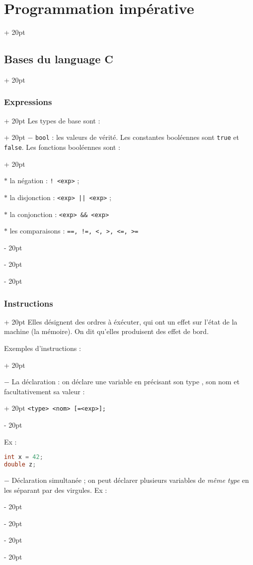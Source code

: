 \documentclass[a4paper, 12pt, twoside]{article}
\newcommand{\ind}[1][20pt]{\advance\leftskip + #1}
\newcommand{\deind}[1][20pt]{\advance\leftskip - #1}
\newcommand{\indented}[2][20pt]{\par \ind[#1] #2 \par \deind[#1]}
\newenvironment{indentedenv}[1][20pt]{\par \ind[#1]}{\par \deind}
\newenvironment{indt}[2][20pt]{#2 \begin{indentedenv}[#1]}{\end{indentedenv}} %
\begin{document}
\begin{indt}{\section{Programmation impérative}}
\begin{indt}{\subsection{Bases du language C}}
\begin{indt}{\subsubsection{Expressions}}
\begin{indt}{Les types de base sont :}
                    $-$ \texttt{bool} : les valeurs de vérité. Les constantes booléennes sont \texttt{true} et \texttt{false}.
                    \begin{indt}{Les fonctions booléennes sont :}
                    
                        $*$ la négation : \texttt{! <exp>} ;
                        
                        $*$ la disjonction : \texttt{<exp> || <exp>} ;
                        
                        $*$ la conjonction : \texttt{<exp> \&\& <exp>}
                        
                        $*$ les comparaisons : \texttt{==, !=, <, >, <=, >=}
                        
                    \end{indt}
                    
                \end{indt}
            \end{indt}
            
            \vspace{12pt}
            
            \begin{indt}{\subsubsection{Instructions}}
                Elles désignent des ordres à éxécuter, qui ont un effet sur l'état de la machine (la mémoire). On dit qu'elles produisent des effet de bord.
                
                \begin{indt}{Exemples d'instructions :}
                    
                    $-$ La déclaration : on déclare une variable en précisant son type , son nom et facultativement sa valeur :
                    \indented{\texttt{<type> <nom> [=<exp>];}}
                    
                    Ex :
                    \begin{lstlisting}[language=C, xleftmargin=100pt]
int x = 42;
double z;
                    \end{lstlisting}
                    
                    $-$ Déclaration simultanée ; on peut déclarer plusieurs variables de \textit{même type} en les séparant par des virgules. Ex :
                    

\end{indt}
\end{indt}
\end{indt}
\end{indt}
\end{document}

